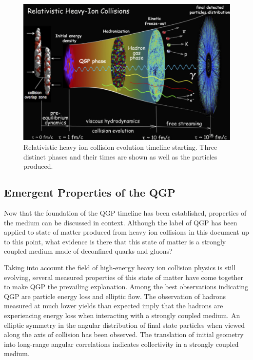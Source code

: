 \begin{figure}[!ht]
\begin{center}
\includegraphics[width=0.78\linewidth]{figs/qgp_evolution_timeline.png}
\caption{Relativistic heavy ion collision evolution timeline starting. Three distinct phases and their times are shown as well as the particles produced.}
\end{center}
\label{fig:qgp_timeline}
\end{figure}

\subsection{Emergent Properties of the QGP}
Now that the foundation of the QGP timeline has been established, properties of the medium can be discussed in context. Although the label of QGP has been applied to state of matter produced from heavy ion collisions in this document up to this point, what evidence is there that this state of matter is a strongly coupled  medium made of deconfined quarks and gluons?

Taking into account the field of high-energy heavy ion collision physics is still evolving, several measured properties of this state of matter have come together to make QGP the prevailing explanation. Among the best observations indicating QGP are particle energy loss and elliptic flow. The observation of hadrons measured at much lower yields than expected imply that the hadrons are experiencing energy loss when interacting with a strongly coupled medium.  An elliptic symmetry in the angular distribution of final state particles when viewed along the axis of collision has been observed. The translation of initial geometry into long-range angular correlations indicates collectivity in a strongly coupled medium.


